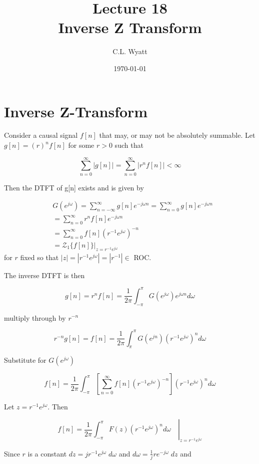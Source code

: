 \documentclass{article}
\begin{document}
\title{Lecture 18\\Inverse Z Transform}
\author{C.L. Wyatt}
\date{\today}
\maketitle

\section{Inverse Z-Transform}

Consider a causal signal $f[n]$ that may, or may not be absolutely summable. Let $g[n]=(r)^{n} f[n]$ for some $r>0$ such that

$$
\sum_{n=0}^{\infty}|g[n]|=\sum_{n=0}^{\infty}\left|r^{n} f[n]\right|<\infty
$$

Then the DTFT of g[n] exists and is given by

$$
\begin{aligned}
& G\left(e^{j \omega}\right)=\sum_{n=-\infty}^{\infty} g[n] e^{-j \omega n}=\sum_{n=0}^{\infty} g[n] e^{-j \omega n} \\
&=\sum_{n=0}^{\infty} r^{n} f[n] e^{-j \omega n} \\
&=\sum_{n=0}^{\infty} f[n]\left(r^{-1} e^{j \omega}\right)^{-n} \\
&=\left.\mathcal{Z}_{1}\{f[n]\}\right|_{z=r^{-1} e^{j \omega}} 
\end{aligned}
$$
for $r$ fixed so that $|z| = |r^{-1} e^{j\omega}| = |r^{-1}| \in$ ROC.

The inverse DTFT is then

$$
g[n]=r^{n} f[n]=\frac{1}{2 \pi} \int_{-\pi}^{\pi} G\left(e^{j \omega}\right) e^{j \omega n} d \omega
$$

multiply through by $r^{-n}$

$$
r^{-n} g[n]=f[n]=\frac{1}{2 \pi} \int_{\pi}^{\pi} G\left(e^{j n}\right)\left(r^{-1} e^{j \omega}\right)^{n} d \omega
$$

Substitute for $G\left(e^{j \omega}\right)$

$$
f[n]=\frac{1}{2 \pi} \int_{-\pi}^{\pi} \left[ \sum_{n=0}^{\infty} f[n]\left(r^{-1} e^{j \omega}\right)^{-n} \right] \left(r^{-1} e^{j \omega}\right)^{n} d \omega
$$

Let $z=r^{-1}e^{j\omega}$. Then

$$
f[n]=\left. \frac{1}{2 \pi} \int_{-\pi}^{\pi} F(z) \left(r^{-1} e^{j \omega}\right)^{n} d \omega \quad \right|_{z=r^{-1}e^{j\omega}}
$$

Since $r$ is a constant $dz=jr^{-1}e^{j\omega}\; d\omega$ and $d\omega = \frac{1}{j} re^{-j\omega}\; dz$ and
\end{document}
